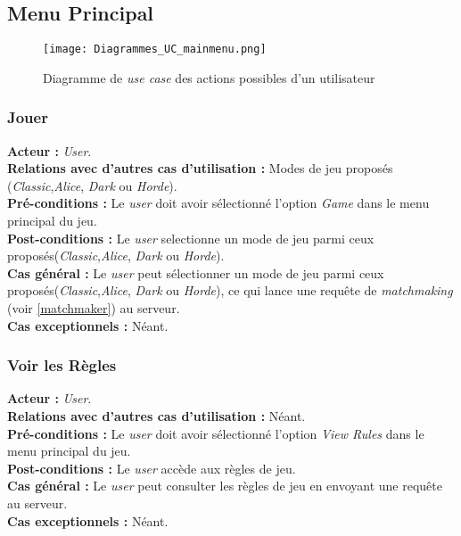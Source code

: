 \documentclass[10pt, a4paper]{article}
\begin{document}
\subsection{Menu Principal}

\begin{figure}
\begin{center}
\texttt{[image: Diagrammes\_UC\_mainmenu.png]}
\caption{Diagramme de \textit{use case} des actions possibles d'un utilisateur}
\label{UC_menu} %
\end{center}
\end{figure}

\subsubsection{Jouer}
\textbf{Acteur :} \textit{User}.\\
\textbf{Relations avec d'autres cas d'utilisation :} Modes de jeu proposés (\textit{Classic},\textit{Alice}, \textit{Dark} ou \textit{Horde}).\\
\textbf{Pré-conditions :} Le \textit{user} doit avoir sélectionné l'option \textit{Game} dans le menu principal du jeu.\\
\textbf{Post-conditions :} Le \textit{user} selectionne un mode de jeu parmi ceux proposés(\textit{Classic},\textit{Alice}, \textit{Dark} ou \textit{Horde}).\\
\textbf{Cas général :} Le \textit{user} peut sélectionner un mode de jeu parmi ceux proposés(\textit{Classic},\textit{Alice}, \textit{Dark} ou \textit{Horde}), ce qui lance une requête de \textit{matchmaking} (voir \ref{matchmaker}) au serveur.\\
\textbf{Cas exceptionnels :} Néant.



\subsubsection{Voir les Règles}
\textbf{Acteur :} \textit{User}.\\
\textbf{Relations avec d'autres cas d'utilisation :} Néant.\\
\textbf{Pré-conditions :} Le \textit{user} doit avoir sélectionné l'option \textit{View Rules} dans le menu principal du jeu.\\
\textbf{Post-conditions :} Le \textit{user} accède aux règles de jeu.\\
\textbf{Cas général :} Le \textit{user} peut consulter les règles de jeu en envoyant une requête au serveur.\\
\textbf{Cas exceptionnels :} Néant.
\end{document}
